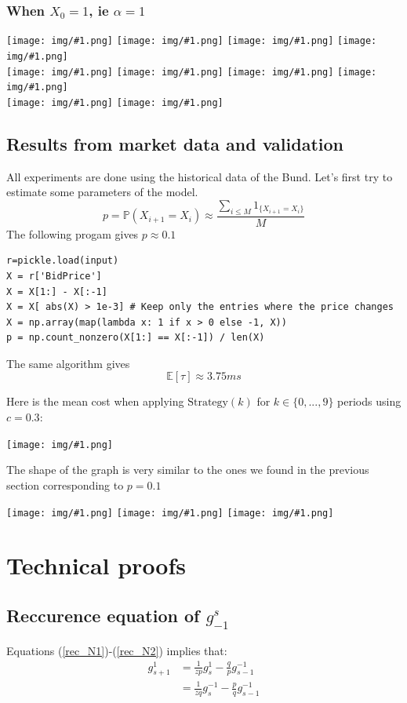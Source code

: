 \documentclass{article}
\newcommand{\g}[2]{g_{#1}^{#2}}
\newcommand{\IMG}[1] { \texttt{[image: img/\#1.png]} }
\newcommand{\IMGG}[1] { \texttt{[image: img/\#1.png]} }
\newcommand{\IMGC}[1] {
\begin{center} \texttt{[image: img/\#1.png]} \end{center}
 }
\begin{document}
\newpage

\subsubsection*{When $X_0 = 1$, ie $\alpha=1$}

\begin{center}


\IMG{11} 
\IMG{12} 
\IMG{13} 
\IMG{14} \\
\IMG{15} 
\IMG{17} 
\IMG{18} 
\IMG{19} \\
\IMG{20}
\IMG{21}

\end{center}

\newpage

\subsection{Results from market data and validation}
All experiments are done using the historical data of the Bund. Let's first try to estimate some parameters of the model.
$$ p = \mathbb{P}(X_{i+1} = X_i)  \approx \frac{ \sum_{i \leq M} 1_{ \{X_{i+1} = X_i \} } }{M} $$
The following progam gives $p \approx 0.1$

\begin{verbatim}
r=pickle.load(input)
X = r['BidPrice']
X = X[1:] - X[:-1]
X = X[ abs(X) > 1e-3] # Keep only the entries where the price changes
X = np.array(map(lambda x: 1 if x > 0 else -1, X))
p = np.count_nonzero(X[1:] == X[:-1]) / len(X)
\end{verbatim}

The same algorithm gives $$\mathbb{E}[ \tau ] \approx 3.75 ms$$

Here is the mean cost when applying $\text{Strategy}(k)$ for $k \in \{0, ... ,9 \}$ periods using $c=0.3$:

\IMGC{esp_market}

The shape of the graph is very similar to the ones we found in the previous section corresponding to $p = 0.1$
\begin{center}
\IMGG{legend}
\IMG{1}
\IMG{12}
\end{center}

\newpage

\appendix


\section{  Technical proofs}

\subsection{ Reccurence equation of $\g{-1}{s}$ }
Equations (\ref{rec_N1})-(\ref{rec_N2}) implies that:
\begin{align*}
		\g{s+1}{1} &= \frac{1}{z p} \g{s}{1} - \frac{q}{p} \g{s-1}{-1} \\
&= \frac{1}{ zq} \g{s}{-1} - \frac{p}{q} \g{s-1}{-1}
\end{align*}
\end{document}
